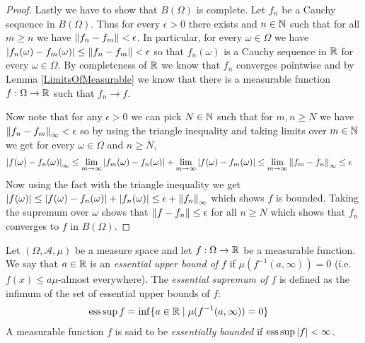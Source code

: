 \begin{proof}
Lastly we have to show that $B(\Omega)$ is complete.  Let $f_n$ be a Cauchy sequence in $B(\Omega)$.  Thus for every $\epsilon > 0$ there exists and $n \in \mathbb{N}$ such that for all $m \geq n$ we have $\left \lVert f_n - f_m \right \rVert < \epsilon$.  In particular, for every $\omega \in \Omega$ we have $\left \vert f_n(\omega) - f_m(\omega) \right \vert \leq \left \lVert f_n - f_m \right \rVert < \epsilon$ so that $f_n(\omega)$ is a Cauchy sequence in $\mathbb{R}$ for every $\omega \in \Omega$.  By completeness of $\mathbb{R}$ we know that $f_n$ converges pointwise and by Lemma \ref{LimitsOfMeasurable} we know that there is a measurable function $f : \Omega \to \mathbb{R}$ such that $f_n \to f$.  

Now note that for any $\epsilon > 0$ we can pick $N \in \mathbb{N}$ such that for $m,n \geq N$ we have $\left \lVert f_n-f_m \right \rVert_\infty < \epsilon$ so by using the triangle inequality and taking limits over $m \in \mathbb{N}$ we get for every $\omega \in \Omega$ and $n \geq N$,
\begin{align*}
\left \vert f (\omega) -f_n(\omega) \right \vert_\infty &\leq \lim_{m \to \infty} \left \vert f_m(\omega) -f_n(\omega) \right \vert + \lim_{m \to \infty} \left \vert f(\omega) -f_m(\omega) \right \vert 
\leq \lim_{m \to \infty} \left \lVert f_m -f_n \right \rVert_\infty \leq \epsilon
\end{align*}
Now using the fact with the triangle inequality we get $\left \vert f(\omega) \right \vert \leq \left \vert f(\omega) - f_n(\omega) \right \vert + \left \vert f_n(\omega) \right \vert \leq \epsilon + \left \lVert f_n \right \rVert_\infty$ which shows $f$ is bounded.  Taking the supremum over $\omega$ shows that $\left \lVert f -f_n \right \rVert \leq \epsilon$ for all $n \geq N$ which shows that $f_n$ converges to $f$ in $B(\Omega)$.
\end{proof}

\begin{defn}Let $(\Omega, \mathcal{A}, \mu)$ be a measure space and let $f : \Omega \to \mathbb{R}$ be a measurable function.  We say that $a \in \mathbb{R}$ is an \emph{essential upper bound of $f$} if $\mu(f^{-1}(a, \infty)) = 0$ (i.e. $f(x) \leq a \mu$-almost everywhere).  The \emph{essential supremum of $f$} is defined as the infimum of the set of essential upper bounds of $f$: 
\begin{align*}
\operatorname*{ess\,sup} f &= \inf \lbrace a \in \mathbb{R} \mid \mu(f^{-1}(a,\infty)) = 0 \rbrace
\end{align*}
A measurable function $f$ is said to be \emph{essentially bounded} if $\operatorname*{ess\,sup} \left \vert f \right \vert < \infty$.
\end{defn}


